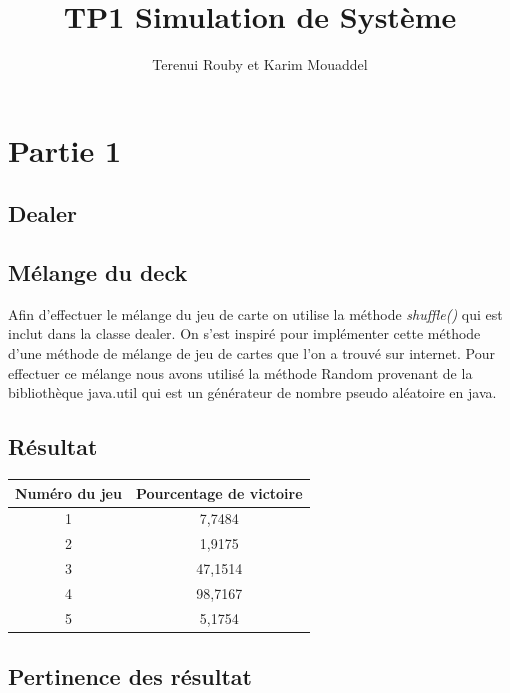 \documentclass{article}
\title{TP1 Simulation de Système }
\author{Terenui Rouby et Karim Mouaddel}
\begin{document}
\maketitle
{}
\thispagestyle{empty}

\newpage
{}
\tableofcontents

\newpage
{}
\section{Partie 1}
\subsection{Dealer}
\subsection{Mélange du deck}
Afin d'effectuer le mélange du jeu de carte on utilise la méthode \textit{shuffle()} qui est inclut dans la classe dealer. On s'est inspiré pour implémenter cette méthode d'une méthode de mélange de jeu de cartes que l'on a trouvé sur internet. Pour effectuer ce mélange nous avons utilisé la méthode Random provenant de la bibliothèque java.util qui est un générateur de nombre pseudo aléatoire en java.
\subsection{Résultat}
\vspace{0.5cm}
	\begin{flushleft}
{\renewcommand{\arraystretch}{2} %
{\setlength{\tabcolsep}{1.5cm} %
	\begin{tabular}{|c|c|}
			\hline
			Numéro du jeu & Pourcentage de victoire\\ \hline
			1 & 7,7484 \\ \hline
			2 & 1,9175 \\ \hline
			3 & 47,1514 \\ \hline
			4 & 98,7167 \\ \hline
			5 & 5,1754 \\
				\hline

		\end{tabular}}}

	\end{flushleft}

\subsection{Pertinence des résultat}
\end{document}
